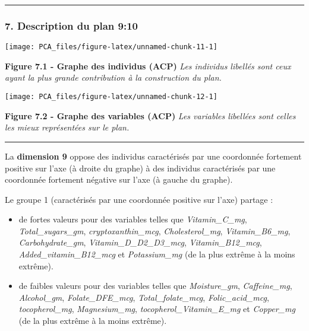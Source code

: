 \documentclass[]{article}
\providecommand{\tightlist}{%
  \setlength{\itemsep}{0pt}\setlength{\parskip}{0pt}}
\begin{document}
\begin{center}\rule{0.5\linewidth}{\linethickness}\end{center}

\subsubsection{7. Description du plan
9:10}\label{description-du-plan-910}

\begin{center}\texttt{[image: PCA\_files/figure-latex/unnamed-chunk-11-1]} \end{center}

\textbf{Figure 7.1 - Graphe des individus (ACP)} \emph{Les individus
libellés sont ceux ayant la plus grande contribution à la construction
du plan.}

\begin{center}\texttt{[image: PCA\_files/figure-latex/unnamed-chunk-12-1]} \end{center}

\textbf{Figure 7.2 - Graphe des variables (ACP)} \emph{Les variables
libellées sont celles les mieux représentées sur le plan.}

\begin{center}\rule{0.5\linewidth}{\linethickness}\end{center}

La \textbf{dimension 9} oppose des individus caractérisés par une
coordonnée fortement positive sur l'axe (à droite du graphe) à des
individus caractérisés par une coordonnée fortement négative sur l'axe
(à gauche du graphe).

Le groupe 1 (caractérisés par une coordonnée positive sur l'axe) partage
:

\begin{itemize}
\tightlist
\item
  de fortes valeurs pour des variables telles que \emph{Vitamin\_C\_mg},
  \emph{Total\_sugars\_gm}, \emph{cryptoxanthin\_mcg},
  \emph{Cholesterol\_mg}, \emph{Vitamin\_B6\_mg},
  \emph{Carbohydrate\_gm}, \emph{Vitamin\_D\_D2\_D3\_mcg},
  \emph{Vitamin\_B12\_mcg}, \emph{Added\_vitamin\_B12\_mcg} et
  \emph{Potassium\_mg} (de la plus extrême à la moins extrême).
\item
  de faibles valeurs pour des variables telles que \emph{Moisture\_gm},
  \emph{Caffeine\_mg}, \emph{Alcohol\_gm}, \emph{Folate\_DFE\_mcg},
  \emph{Total\_folate\_mcg}, \emph{Folic\_acid\_mcg},
  \emph{tocopherol\_mg}, \emph{Magnesium\_mg},
  \emph{tocopherol\_Vitamin\_E\_mg} et \emph{Copper\_mg} (de la plus
  extrême à la moins extrême).
\end{itemize}
\end{document}
